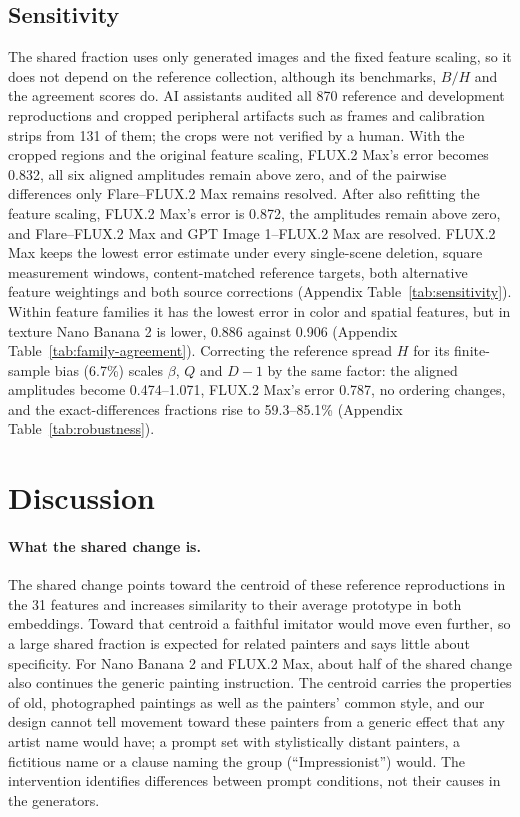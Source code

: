\documentclass[10pt]{article}
\begin{document}
\subsection{Sensitivity}\label{sec:sensitivity}

The shared fraction uses only generated images and the fixed feature scaling, so it does not depend
on the reference collection, although its benchmarks, $B/H$ and the agreement scores do. AI
assistants audited all 870 reference and development reproductions and cropped peripheral
artifacts such as frames and calibration strips from 131 of them; the crops were not verified by a
human. With the cropped regions and the original feature scaling, FLUX.2 Max's error becomes 0.832,
all six aligned amplitudes remain above zero, and of the pairwise differences only Flare--FLUX.2
Max remains resolved. After also refitting the feature scaling, FLUX.2 Max's error is 0.872, the
amplitudes remain above zero, and Flare--FLUX.2 Max and GPT Image 1--FLUX.2 Max are resolved.
FLUX.2 Max keeps the lowest error estimate under every single-scene deletion, square measurement
windows, content-matched reference targets, both alternative feature weightings and both source
corrections (Appendix Table~\ref{tab:sensitivity}). Within feature families it has the lowest error
in color and spatial features, but in texture Nano Banana 2 is lower, 0.886 against 0.906 (Appendix
Table~\ref{tab:family-agreement}). Correcting the reference spread $H$ for its finite-sample bias
(6.7\%) scales $\beta$, $Q$ and $D-1$ by the same factor: the aligned amplitudes become
0.474--1.071, FLUX.2 Max's error 0.787, no ordering changes, and the exact-differences fractions
rise to 59.3--85.1\% (Appendix Table~\ref{tab:robustness}).

\section{Discussion}\label{sec:discussion}

\paragraph{What the shared change is.}
The shared change points toward the centroid of these reference reproductions in the 31 features
and increases similarity to their average prototype in both embeddings. Toward that centroid a
faithful imitator would move even further, so a large shared fraction is expected for related
painters and says little about specificity. For Nano Banana 2 and FLUX.2 Max, about half of the
shared change also continues the generic painting instruction. The centroid carries the properties
of old, photographed paintings as well as the painters' common style, and our design cannot tell
movement toward these painters from a generic effect that any artist name would have; a prompt set
with stylistically distant painters, a fictitious name or a clause naming the group
(``Impressionist'') would. The intervention identifies differences between prompt conditions, not
their causes in the generators.
\end{document}
